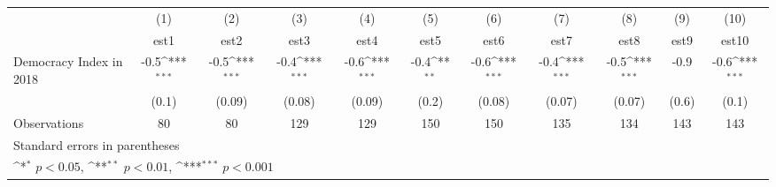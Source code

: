 {
\def\sym#1{\ifmmode^{#1}\else\(^{#1}\)\fi}
\begin{tabular}{l*{10}{c}}
\hline\hline
                    &\multicolumn{1}{c}{(1)}         &\multicolumn{1}{c}{(2)}         &\multicolumn{1}{c}{(3)}         &\multicolumn{1}{c}{(4)}         &\multicolumn{1}{c}{(5)}         &\multicolumn{1}{c}{(6)}         &\multicolumn{1}{c}{(7)}         &\multicolumn{1}{c}{(8)}         &\multicolumn{1}{c}{(9)}         &\multicolumn{1}{c}{(10)}         \\
                    &        est1         &        est2         &        est3         &        est4         &        est5         &        est6         &        est7         &        est8         &        est9         &       est10         \\
\hline
Democracy Index in 2018&        -0.5\sym{***}&        -0.5\sym{***}&        -0.4\sym{***}&        -0.6\sym{***}&        -0.4\sym{**} &        -0.6\sym{***}&        -0.4\sym{***}&        -0.5\sym{***}&        -0.9         &        -0.6\sym{***}\\
                    &       (0.1)         &      (0.09)         &      (0.08)         &      (0.09)         &       (0.2)         &      (0.08)         &      (0.07)         &      (0.07)         &       (0.6)         &       (0.1)         \\
\hline
Observations        &          80         &          80         &         129         &         129         &         150         &         150         &         135         &         134         &         143         &         143         \\
\hline\hline
\multicolumn{11}{l}{\footnotesize Standard errors in parentheses}\\
\multicolumn{11}{l}{\footnotesize \sym{*} \(p<0.05\), \sym{**} \(p<0.01\), \sym{***} \(p<0.001\)}\\
\end{tabular}
}
